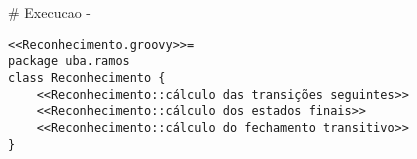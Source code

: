 # Execucao {-}

\begin{lstlisting}[style=java]
<<Reconhecimento.groovy>>=
package uba.ramos
class Reconhecimento {
    <<Reconhecimento::cálculo das transições seguintes>>
    <<Reconhecimento::cálculo dos estados finais>>
    <<Reconhecimento::cálculo do fechamento transitivo>>
}
\end{lstlisting}
